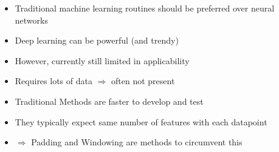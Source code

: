 %
%
\begin{frame}{\insertsubsection}
    \begin{itemize}
        \item Traditional machine learning routines should be preferred over neural networks
        \item Deep learning can be powerful (and trendy)
        \item[] However, currently still limited in applicability
        \item[] Requires lots of data $\Rightarrow$ often not present
        \item Traditional Methods are faster to develop and test
        \item[] They typically expect same number of features with each datapoint
        \item[] $\Rightarrow$ Padding and Windowing are methods to circumvent this
    \end{itemize}
\end{frame}
%
%
